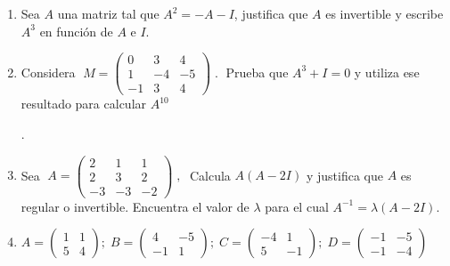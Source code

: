 \begin{enumerate}

\item Sea $A$ una matriz tal que $A^2=-A-I$, justifica que $A$ es invertible y escribe $A^3$ en función de $A$ e $I$.


\item Considera $\; M=\left( \begin{matrix} 0&3&4\\1&-4&-5\\ -1&3&4  \end{matrix}\right)\;.\;  $ Prueba que $A^3+I=0$ y utiliza ese resultado para calcular $A^{10}$

.

\item Sea $\; A=\left( \begin{matrix} 2&1&1\\2&3&2\\-3&-3&-2 \end{matrix} \right) \;, \; $ Calcula $A(A-2I)$ y justifica que $A$ es regular o invertible.  Encuentra el valor de $\lambda$ para el cual $A^{-1}=\lambda(A-2I)$.


\item $A=\left( \begin{matrix} 1&1\\5&4  \end{matrix} \right); \; 
B=\left( \begin{matrix} 4&-5\\-1&1  \end{matrix} \right); \;
C=\left( \begin{matrix} -4&1\\5&-1  \end{matrix} \right); \;
D=\left( \begin{matrix} -1&-5\\-1&-4  \end{matrix} \right)$


\end{enumerate}
